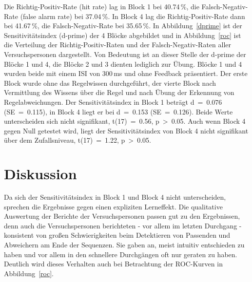 \documentclass[doc,a4paper,12pt]{apa6}
\begin{document}
Die Richtig-Positiv-Rate (hit rate) lag in Block 1 bei 40.74\,\%, die Falsch-Negativ-Rate (false alarm rate) bei 37.04\,\%. In Block 4 lag die Richtig-Positiv-Rate dann bei 41.67\,\%, die Falsch-Negativ-Rate bei 35.65\,\%. In Abbildung~\ref{dprime} ist der Sensitivitätsindex (d-prime) der 4 Blöcke abgebildet und in Abbildung~\ref{roc} ist die Verteilung der Richtig-Positiv-Raten und der Falsch-Negativ-Raten aller Versuchspersonen dargestellt. Von Bedeutung ist an dieser Stelle der d-prime der Blöcke 1 und 4, die Blöcke 2 und 3 dienten lediglich zur Übung. Blöcke 1 und 4 wurden beide mit einem ISI von 300\,ms und ohne Feedback präsentiert. Der erste Block wurde ohne das Regelwissen durchgeführt, der vierte Block nach Vermittlung des Wissens über die Regel und nach Übung der Erkennung von Regelabweichungen. Der Sensitivitätsindex in Block 1 beträgt d~=~0.076 (SE~=~0.115), in Block 4 liegt er bei d~=~0.153 (SE~=~0.126). Beide Werte unterscheiden sich nicht signifikant, t(17)~=~0.56, p~>~0.05. Auch wenn Block 4 gegen Null getestet wird, liegt der Sensitivitätsindex von Block 4 nicht signifikant über dem Zufallsniveau, t(17)~=~1.22, p~>~0.05.

\section{Diskussion}

Da sich der Sensitivitätsindex in Block 1 und Block 4 nicht unterscheiden, sprechen die Ergebnisse gegen einen expliziten Lerneffekt. Die qualitative Auswertung der Berichte der Versuchspersonen passen gut zu den Ergebnissen, denn auch die Versuchspersonen berichteten - vor allem im letzten Durchgang - konsistent von großen Schwierigkeiten beim Detektieren von Passenden und Abweichern am Ende der Sequenzen. Sie gaben an, meist intuitiv entschieden zu haben und vor allem in den schnellere Durchgängen oft nur geraten zu haben. Deutlich wird dieses Verhalten auch bei Betrachtung der ROC-Kurven in Abbildung~\ref{roc}.
\end{document}
